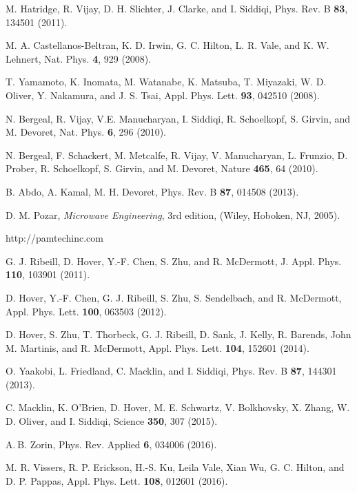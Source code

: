 \documentclass[aip,onecolumn,10pt]{revtex4}%
\begin{document}
\begin{thebibliography}{99}
	 M. Hatridge, R. Vijay, D. H. Slichter, J. Clarke, and I. Siddiqi, Phys. Rev. B \textbf{83}, 134501 (2011).  
	
	M. A. Castellanos-Beltran, K. D. Irwin, G. C. Hilton, L. R. Vale, and K. W. Lehnert, Nat. Phys. \textbf{4}, 929 (2008).
	
	 T. Yamamoto, K. Inomata, M. Watanabe, K. Matsuba, T. Miyazaki, W. D. Oliver, Y. Nakamura, and J. S. Tsai, Appl. Phys. Lett. \textbf{93}, 042510 (2008).
	
	N. Bergeal, R. Vijay, V.E. Manucharyan, I. Siddiqi, R. Schoelkopf, S. Girvin, and M. Devoret, Nat. Phys. \textbf{6}, 296 (2010).
	
	N. Bergeal, F. Schackert, M. Metcalfe, R. Vijay, V. Manucharyan, L. Frunzio, D. Prober, R. Schoelkopf, S. Girvin, and M. Devoret, Nature \textbf{465}, 64 (2010).
	
	B. Abdo, A. Kamal, M. H. Devoret, Phys. Rev. B \textbf{87}, 014508 (2013).
	
	 D. M. Pozar, \textit{Microwave Engineering}, 3rd edition, (Wiley, Hoboken, NJ, 2005).
	
	 http://pamtechinc.com
	
	G. J. Ribeill, D. Hover, Y.-F. Chen, S. Zhu, and R. McDermott, J. Appl. Phys. \textbf{110}, 103901 (2011).
	
	 D. Hover, Y.-F. Chen, G. J. Ribeill, S. Zhu, S. Sendelbach, and R. McDermott, Appl. Phys. Lett. \textbf{100}, 063503 (2012).
	
	  D. Hover, S. Zhu, T. Thorbeck, G. J. Ribeill, D. Sank, J. Kelly, R. Barends, John M. Martinis, and R. McDermott, Appl. Phys. Lett. \textbf{104}, 152601 (2014).
	
	 O. Yaakobi, L. Friedland, C. Macklin, and I. Siddiqi, Phys. Rev. B \textbf{87}, 144301 (2013).
	
	 C. Macklin, K. O'Brien, D. Hover, M. E. Schwartz, V. Bolkhovsky, X. Zhang, W. D. Oliver, and I. Siddiqi, Science \textbf{350}, 307 (2015).
	
	 A. B. Zorin, Phys. Rev. Applied \textbf{6}, 034006 (2016).
	
	 M. R. Vissers, R. P. Erickson, H.-S. Ku, Leila Vale, Xian Wu, G. C. Hilton, and D. P. Pappas, Appl. Phys. Lett. \textbf{108}, 012601 (2016).
	

\end{thebibliography}
\end{document}
